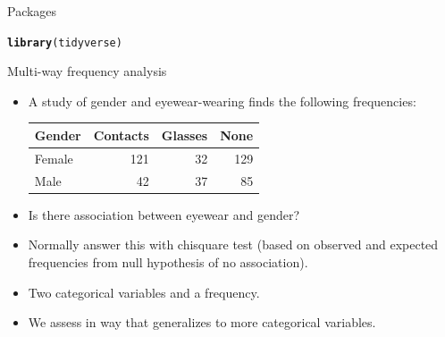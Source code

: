\documentclass[unknownkeysallowed]{beamer}\usepackage[]{graphicx}\usepackage[]{color}
\makeatletter
\newcommand{\hlstd}[1]{\textcolor[rgb]{0.345,0.345,0.345}{#1}}%
\newcommand{\hlkwd}[1]{\textcolor[rgb]{0.737,0.353,0.396}{\textbf{#1}}}%
\newenvironment{kframe}{%
 \def\at@end@of@kframe{}%
 \ifinner\ifhmode%
  \def\at@end@of@kframe{\end{minipage}}%
  \begin{minipage}{\columnwidth}%
 \fi\fi%
 \def\FrameCommand##1{\hskip\@totalleftmargin \hskip-\fboxsep
 \colorbox{shadecolor}{##1}\hskip-\fboxsep
     \hskip-\linewidth \hskip-\@totalleftmargin \hskip\columnwidth}%
 \MakeFramed {\advance\hsize-\width
   \@totalleftmargin\z@ \linewidth\hsize
   \@setminipage}}%
 {\par\unskip\endMakeFramed%
 \at@end@of@kframe}
\newenvironment{knitrout}{}{} %
\makeatother
\begin{document}
\begin{frame}[fragile]{Packages}
  
\begin{knitrout}\footnotesize
{}\color{fgcolor}\begin{kframe}
\begin{alltt}
\hlkwd{library}\hlstd{(tidyverse)}
\end{alltt}


{\ttfamily\noindent\itshape\color{messagecolor}{\#\# -- Attaching packages ------------------- tidyverse 1.2.1 --}}

{\ttfamily\noindent\itshape\color{messagecolor}{\#\# v ggplot2 3.1.0\ \ \ \ \ \  v purrr\ \  0.3.1\ \ \\\#\# v tibble\ \ 2.0.1\ \ \ \ \ \  v dplyr\ \  0.8.0.1\\\#\# v tidyr\ \  0.8.3\ \ \ \ \ \  v stringr 1.4.0\ \ \\\#\# v readr\ \  1.3.1\ \ \ \ \ \  v forcats 0.3.0}}

{\ttfamily\noindent\itshape\color{messagecolor}{\#\# -- Conflicts ---------------------- tidyverse\_conflicts() --\\\#\# x dplyr::filter() masks stats::filter()\\\#\# x dplyr::lag()\ \ \ \ masks stats::lag()}}\end{kframe}
\end{knitrout}
  
\end{frame}

\begin{frame}[fragile]{Multi-way frequency analysis}

  \begin{itemize}
  \item A study of gender and eyewear-wearing finds the following frequencies:

    \begin{tabular}{lrrr}
      \hline
      Gender & Contacts & Glasses & None \\
      \hline
      Female & 121 & 32 & 129 \\
      Male & 42 & 37 & 85\\
      \hline
    \end{tabular}


  \item Is there association between eyewear and gender?
  \item Normally answer this with chisquare test (based on observed and expected frequencies from null hypothesis of no association).
  \item Two categorical variables and a frequency.
  \item We assess in way that generalizes to more categorical variables.

  \end{itemize}

\end{frame}
\end{document}
